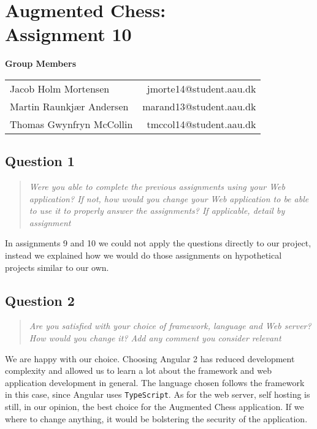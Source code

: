 \documentclass[10pt,a4paper]{report}
\begin{document}
\chapter{Augmented Chess:\\ Assignment 10}

\begin{center}
	{\Large \textbf{Group Members}}
	\begin{tabular}{l r}
		Jacob Holm Mortensen            &       jmorte14@student.aau.dk\\
		Martin Raunkjær Andersen        &       marand13@student.aau.dk\\
		Thomas Gwynfryn McCollin        &       tmccol14@student.aau.dk
	\end{tabular}
\end{center}

\section{Question 1}
\begin{quote}
\textit{Were you able to complete the previous assignments using your Web application? If not, how would you change your Web application to be able to use it to properly answer the assignments? If applicable, detail by assignment}
\end{quote}

In assignments 9 and 10 we could not apply the questions directly to our project, instead we explained how we would do those assignments on hypothetical projects similar to our own.

\section{Question 2}
\begin{quote}
\textit{Are you satisfied with your choice of framework, language and Web server? How would you change it? Add any comment you consider relevant}
\end{quote}

We are happy with our choice. Choosing Angular 2 has reduced development complexity and allowed us to learn a lot about the framework and web application development in general. The language chosen follows the framework in this case, since Angular uses \texttt{TypeScript}. As for the web server, self hosting is still, in our opinion, the best choice for the Augmented Chess application. If we where to change anything, it would be bolstering the security of the application.
\end{document}
